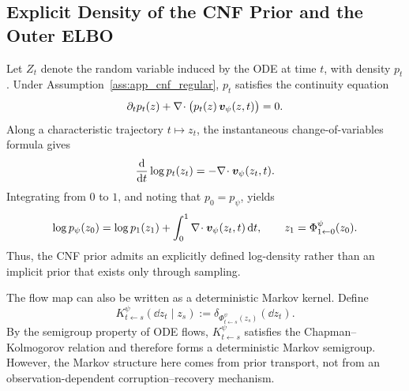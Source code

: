 \subsection{Explicit Density of the CNF Prior and the Outer ELBO}
\label{app:cnf_and_elbo}

Let $Z_t$ denote the random variable induced by the ODE at time $t$, with density $p_t$. Under Assumption~\ref{ass:app_cnf_regular}, $p_t$ satisfies the continuity equation
\[
\partial_t p_t(z)+\nabla\!\cdot\bigl(p_t(z)\,\bm{v}_{\psi}(z,t)\bigr)=0.
\]
Along a characteristic trajectory $t\mapsto z_t$, the instantaneous change-of-variables formula gives
\begin{equation}
\frac{\mathrm{d}}{\mathrm{d} t}\log p_t(z_t)
=
-\nabla\!\cdot \bm{v}_{\psi}(z_t,t).
\label{eq:app_instantaneous_cov}
\end{equation}
Integrating from $0$ to $1$, and noting that $p_0=p_{\psi}$, yields
\begin{equation}
\log p_{\psi}(z_0)
=
\log p_1(z_1)
+
\int_0^1 \nabla\!\cdot \bm{v}_{\psi}(z_t,t)\,\mathrm{d} t,
\qquad z_1=\Phi^{\psi}_{1\leftarrow 0}(z_0).
\label{eq:app_prior_log_density}
\end{equation}
Thus, the CNF prior admits an explicitly defined log-density rather than an implicit prior that exists only through sampling.

The flow map can also be written as a deterministic Markov kernel. Define
\begin{equation}
K^{\psi}_{t\leftarrow s}(\dd z_t\mid z_s)
:=
\delta_{\Phi^{\psi}_{t\leftarrow s}(z_s)}(\dd z_t).
\label{eq:app_cnf_markov_kernel}
\end{equation}
By the semigroup property of ODE flows, $K^{\psi}_{t\leftarrow s}$ satisfies the Chapman--Kolmogorov relation and therefore forms a deterministic Markov semigroup. However, the Markov structure here comes from prior transport, not from an observation-dependent corruption--recovery mechanism.

